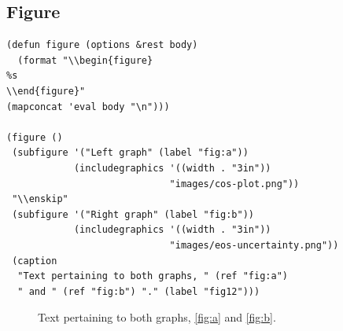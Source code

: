 \documentclass[11pt]{article}
\begin{document}
\subsection{Figure}
\label{sec-1-1}
\begin{verbatim}
(defun figure (options &rest body)
  (format "\\begin{figure}
%s
\\end{figure}"
(mapconcat 'eval body "\n")))

(figure ()
 (subfigure '("Left graph" (label "fig:a"))
            (includegraphics '((width . "3in"))
                             "images/cos-plot.png"))
 "\\enskip"
 (subfigure '("Right graph" (label "fig:b"))
            (includegraphics '((width . "3in"))
                             "images/eos-uncertainty.png"))
 (caption
  "Text pertaining to both graphs, " (ref "fig:a")
  " and " (ref "fig:b") "." (label "fig12")))
\end{verbatim}
\begin{figure}
\enskip
{}
\caption{Text pertaining to both graphs, \ref{fig:a} and \ref{fig:b}.\label{fig12}}
\end{figure}
\end{document}

